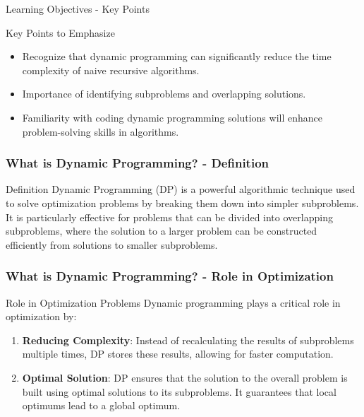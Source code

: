 \documentclass[aspectratio=169]{beamer}
\begin{document}
\begin{frame}[fragile]{Learning Objectives - Key Points}
    \begin{block}{Key Points to Emphasize}
        \begin{itemize}
            \item Recognize that dynamic programming can significantly reduce the time complexity of naive recursive algorithms.
            \item Importance of identifying subproblems and overlapping solutions.
            \item Familiarity with coding dynamic programming solutions will enhance problem-solving skills in algorithms.
        \end{itemize}
    \end{block}
\end{frame}

\begin{frame}[fragile]
  \frametitle{What is Dynamic Programming? - Definition}
  \begin{block}{Definition}
    Dynamic Programming (DP) is a powerful algorithmic technique used to solve optimization problems by breaking them down into simpler subproblems. 
    It is particularly effective for problems that can be divided into overlapping subproblems, where the solution to a larger problem can be constructed efficiently from solutions to smaller subproblems.
  \end{block}
\end{frame}

\begin{frame}[fragile]
  \frametitle{What is Dynamic Programming? - Role in Optimization}
  \begin{block}{Role in Optimization Problems}
    Dynamic programming plays a critical role in optimization by:
    \begin{enumerate}
      \item \textbf{Reducing Complexity}: Instead of recalculating the results of subproblems multiple times, DP stores these results, allowing for faster computation.
      \item \textbf{Optimal Solution}: DP ensures that the solution to the overall problem is built using optimal solutions to its subproblems. It guarantees that local optimums lead to a global optimum.
    \end{enumerate}
  \end{block}
\end{frame}
\end{document}
